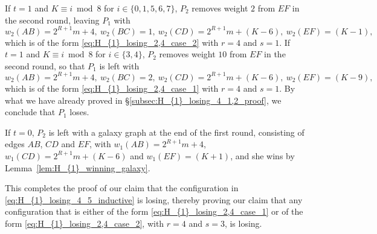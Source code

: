 \documentclass[11pt,reqno]{amsart}
\theoremstyle{definition}
\theoremstyle{definition}
\begin{document}
\begin{enumerate}
If $t=1$ and $K\equiv i \bmod 8$ for $i \in \{0,1,5,6,7\}$, $P_{2}$ removes weight $2$ from $EF$ in the second round, leaving $P_{1}$ with
\begin{equation}
w_{2}(AB)=2^{R+1}m+4,\ w_{2}(BC)=1,\ w_{2}(CD)=2^{R+1}m+(K-6),\ w_{2}(EF)=(K-1),\nonumber
\end{equation}
which is of the form \eqref{eq:H_{1}_losing_2,4_case_2} with $r=4$ and $s=1$. If $t=1$ and $K \equiv i \bmod 8$ for $i \in \{3,4\}$, $P_{2}$ removes weight $10$ from $EF$ in the second round, so that $P_{1}$ is left with
\begin{equation}
w_{2}(AB)=2^{R+1}m+4,\ w_{2}(BC)=2,\ w_{2}(CD)=2^{R+1}m+(K-6),\ w_{2}(EF)=(K-9),\nonumber
\end{equation}
which is of the form \eqref{eq:H_{1}_losing_2,4_case_1} with $r=4$ and $s=1$. By what we have already proved in \S\ref{subsec:H_{1}_losing_4_1,2_proof}, we conclude that $P_{1}$ loses.

If $t=0$, $P_{2}$ is left with a galaxy graph at the end of the first round, consisting of edges $AB$, $CD$ and $EF$, with $w_{1}(AB)=2^{R+1}m+4$, $w_{1}(CD)=2^{R+1}m+(K-6)$ and $w_{1}(EF)=(K+1)$, and she wins by Lemma~\ref{lem:H_{1}_winning_galaxy}. 
\end{enumerate}
This completes the proof of our claim that the configuration in \eqref{eq:H_{1}_losing_4_5_inductive} is losing, thereby proving our claim that any configuration that is either of the form \eqref{eq:H_{1}_losing_2,4_case_1} or of the form \eqref{eq:H_{1}_losing_2,4_case_2}, with $r=4$ and $s=3$, is losing.
\end{document}
